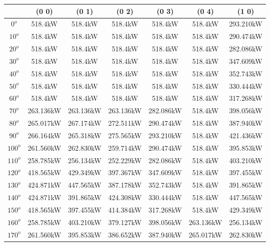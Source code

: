         \singlespacing
        \begin{table}[H]
        	\centering
        	\begin{tabular}{|c|c|c|c|c|c|c|} \hline
        			& (0 0)		& (0 1)		& (0 2)		& (0 3)		& (0 4)		& (1 0)		\\ \hline
		$0^o$	& 518.4kW	& 518.4kW	& 518.4kW	& 518.4kW	& 518.4kW	& 293.210kW	\\ \hline
		$10^o$	& 518.4kW	& 518.4kW	& 518.4kW	& 518.4kW	& 518.4kW	& 290.474kW	\\ \hline
		$20^o$	& 518.4kW	& 518.4kW	& 518.4kW	& 518.4kW	& 518.4kW	& 282.086kW	\\ \hline
		$30^o$	& 518.4kW	& 518.4kW	& 518.4kW	& 518.4kW	& 518.4kW	& 347.609kW	\\ \hline
		$40^o$	& 518.4kW	& 518.4kW	& 518.4kW	& 518.4kW	& 518.4kW	& 352.743kW	\\ \hline
		$50^o$	& 518.4kW	& 518.4kW	& 518.4kW	& 518.4kW	& 518.4kW	& 330.444kW	\\ \hline
		$60^o$	& 518.4kW	& 518.4kW	& 518.4kW	& 518.4kW	& 518.4kW	& 317.268kW	\\ \hline
		$70^o$	& 263.136kW	& 263.136kW	& 263.136kW	& 282.086kW	& 518.4kW	& 398.056kW	\\ \hline
		$80^o$	& 265.017kW	& 267.174kW	& 272.511kW	& 290.474kW	& 518.4kW	& 387.940kW	\\ \hline
		$90^o$	& 266.164kW	& 265.318kW	& 275.565kW	& 293.210kW	& 518.4kW	& 421.436kW	\\ \hline
		$100^o$	& 261.560kW	& 262.830kW	& 259.714kW	& 290.474kW	& 518.4kW	& 395.853kW	\\ \hline
		$110^o$	& 258.785kW	& 256.134kW	& 252.229kW	& 282.086kW	& 518.4kW	& 403.210kW	\\ \hline
		$120^o$	& 418.565kW	& 429.349kW	& 397.367kW	& 347.609kW	& 518.4kW	& 397.455kW	\\ \hline
		$130^o$	& 424.871kW	& 447.565kW	& 387.178kW	& 352.743kW	& 518.4kW	& 391.865kW	\\ \hline
		$140^o$	& 424.871kW	& 391.865kW	& 424.308kW	& 330.444kW	& 518.4kW	& 447.565kW	\\ \hline
		$150^o$	& 418.565kW	& 397.455kW	& 414.384kW	& 317.268kW	& 518.4kW	& 429.349kW	\\ \hline
		$160^o$	& 258.785kW	& 403.210kW	& 379.127kW	& 398.056kW	& 263.136kW	& 256.134kW	\\ \hline
		$170^o$	& 261.560kW	& 395.853kW	& 386.652kW	& 387.940kW	& 265.017kW	& 262.830kW	\\ \hline

\end{tabular}
\end{table}
